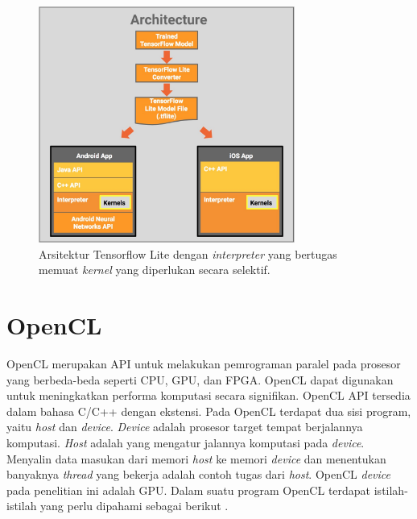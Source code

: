 \begin{figure}
	\centering
	\includegraphics[width=0.75\textwidth]
	{pics/tflite.jpg}
	\caption{Arsitektur Tensorflow Lite dengan \textit{interpreter} yang bertugas memuat \textit{kernel} yang diperlukan secara selektif.}
	\label{fig:tflite}
\end{figure}

\section{OpenCL}
OpenCL merupakan API untuk melakukan pemrograman paralel pada prosesor yang berbeda-beda seperti CPU, GPU, dan FPGA. OpenCL dapat digunakan untuk meningkatkan performa komputasi secara signifikan. OpenCL API tersedia dalam bahasa C/C++ dengan ekstensi. Pada OpenCL terdapat dua sisi program, yaitu \textit{host} dan \textit{device}. \textit{Device} adalah prosesor target tempat berjalannya komputasi. \textit{Host} adalah yang mengatur jalannya komputasi pada \textit{device}. Menyalin data masukan dari memori \textit{host} ke memori \textit{device} dan menentukan banyaknya \textit{thread} yang bekerja adalah contoh tugas dari \textit{host}. OpenCL \textit{device} pada penelitian ini adalah GPU. Dalam suatu program OpenCL terdapat istilah-istilah yang perlu dipahami sebagai berikut \cite{openclguide}.

